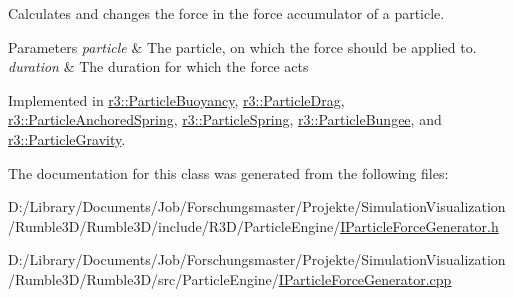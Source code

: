 Calculates and changes the force in the force accumulator of a particle. 


\begin{DoxyParams}{Parameters}
{\em particle} & The particle, on which the force should be applied to. \\
\hline
{\em duration} & The duration for which the force acts \\
\hline
\end{DoxyParams}


Implemented in \mbox{\hyperlink{classr3_1_1_particle_buoyancy_ad1249e51508770fd9b1775c8e22eb51a}{r3\+::\+Particle\+Buoyancy}}, \mbox{\hyperlink{classr3_1_1_particle_drag_abbfc4f053bb921be0068f8928c300384}{r3\+::\+Particle\+Drag}}, \mbox{\hyperlink{classr3_1_1_particle_anchored_spring_aa445db9e0efcc25a422348f4e580ed7f}{r3\+::\+Particle\+Anchored\+Spring}}, \mbox{\hyperlink{classr3_1_1_particle_spring_a113e7bdf36d5edf020abecec5a0fb730}{r3\+::\+Particle\+Spring}}, \mbox{\hyperlink{classr3_1_1_particle_bungee_a04de21f7e418f572a9c9dfc936384b96}{r3\+::\+Particle\+Bungee}}, and \mbox{\hyperlink{classr3_1_1_particle_gravity_a9535686bf25375d94bbe0451c089b788}{r3\+::\+Particle\+Gravity}}.



The documentation for this class was generated from the following files\+:\begin{DoxyCompactItemize}
\item 
D\+:/\+Library/\+Documents/\+Job/\+Forschungsmaster/\+Projekte/\+Simulation\+Visualization/\+Rumble3\+D/\+Rumble3\+D/include/\+R3\+D/\+Particle\+Engine/\mbox{\hyperlink{_i_particle_force_generator_8h}{I\+Particle\+Force\+Generator.\+h}}\item 
D\+:/\+Library/\+Documents/\+Job/\+Forschungsmaster/\+Projekte/\+Simulation\+Visualization/\+Rumble3\+D/\+Rumble3\+D/src/\+Particle\+Engine/\mbox{\hyperlink{_i_particle_force_generator_8cpp}{I\+Particle\+Force\+Generator.\+cpp}}\end{DoxyCompactItemize}
